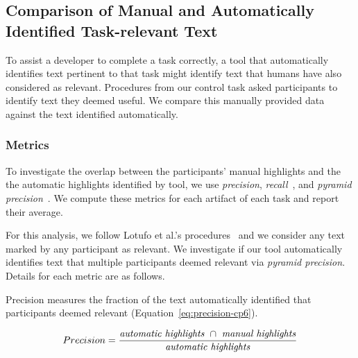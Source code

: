 
\subsection{Comparison of Manual and Automatically Identified Task-relevant Text}
\label{cp6:comparison}



To assist a developer to complete a task correctly, a tool that
automatically identifies text pertinent to that task might 
identify text that humans have also considered as relevant.
Procedures from our control task asked participants to identify text they deemed useful. We
 compare this manually provided data against the text  identified automatically.




\subsubsection{Metrics}

To investigate the overlap between the participants' manual highlights and the 
the automatic highlights identified by \acs{tool}, we use \textit{precision}, 
\textit{recall}~\cite{manning2010IR}, and \textit{pyramid precision}~\cite{Nenkova2004}.
We compute these metrics for each artifact of each task and report their average.


For this analysis, we follow Lotufo et al.'s procedures~\cite{Lotufo2012} and we consider any text marked by any participant as relevant.
We investigate if our tool  automatically identifies text that multiple participants deemed relevant
 via \textit{pyramid precision}. 
Details for each metric are as follows. 


Precision measures the fraction of the text automatically identified  that participants deemed relevant (Equation~\ref{eq:precision-cp6}). 

\medskip
\begin{small}
\begin{equation}
    Precision = \frac{
        \text{\textit{automatic highlights}~} \cap 
        \text{~\textit{manual highlights}}
    }{\text{\textit{automatic highlights}}}
\label{eq:precision-cp6}    
\end{equation}
\end{small}


